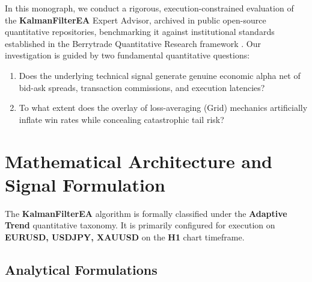 \documentclass[11pt,a4paper]{article}
\begin{document}
In this monograph, we conduct a rigorous, execution-constrained evaluation of the \textbf{KalmanFilterEA} Expert Advisor, archived in public open-source quantitative repositories, benchmarking it against institutional standards established in the Berrytrade Quantitative Research framework \cite{artsu2026illusion}. Our investigation is guided by two fundamental quantitative questions:
\begin{enumerate}
    \item Does the underlying technical signal generate genuine economic alpha net of bid-ask spreads, transaction commissions, and execution latencies?
    \item To what extent does the overlay of loss-averaging (Grid) mechanics artificially inflate win rates while concealing catastrophic tail risk?
\end{enumerate}

\section{Mathematical Architecture and Signal Formulation}
The \textbf{KalmanFilterEA} algorithm is formally classified under the \textbf{Adaptive Trend} quantitative taxonomy. It is primarily configured for execution on \textbf{EURUSD, USDJPY, XAUUSD} on the \textbf{H1} chart timeframe.

\subsection{Analytical Formulations}
\end{document}
